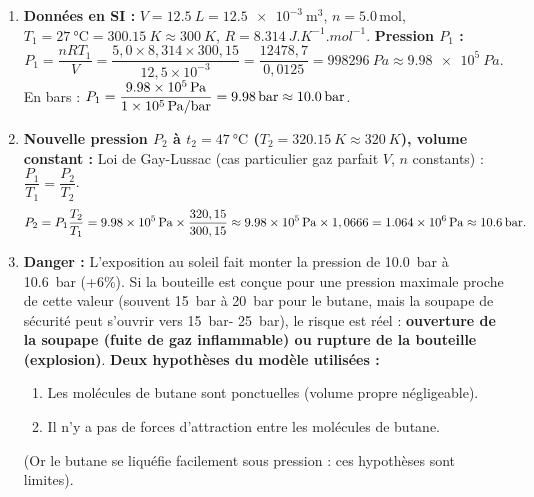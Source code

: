 \documentclass[11pt]{article}
\begin{document}
\begin{corrige}
\begin{enumerate}
\item \textbf{Données en SI :}
      $V = \SI{12,5}{L} = \SI{12,5e-3}{\cubic\meter}$,
      $n = \num{5,0}\,\mathrm{mol}$,
      $T_1 = \SI{27}{\degreeCelsius} = \SI{300,15}{K} \approx \SI{300}{K}$,
      $R = \SI{8,314}{J.K^{-1}.mol^{-1}}$.
      \textbf{Pression $P_1$ :}
      \[
      P_1 = \frac{nRT_1}{V} = \frac{5,0 \times 8,314 \times 300,15}{12,5 \times 10^{-3}}
      = \frac{12478,7}{0,0125} = \SI{998296}{Pa} \approx \SI{9,98e5}{Pa}.
      \]
      En bars : $P_1 = \dfrac{\SI{9,98e5}{Pa}}{\SI{1e5}{Pa/bar}} = \SI{9,98}{bar} \approx \textbf{\SI{10,0}{bar}}$.
\item \textbf{Nouvelle pression $P_2$ à $t_2 = \SI{47}{\degreeCelsius}$ ($T_2 = \SI{320,15}{K} \approx \SI{320}{K}$), volume constant :}
      Loi de Gay-Lussac (cas particulier gaz parfait $V$, $n$ constants) : $\dfrac{P_1}{T_1} = \dfrac{P_2}{T_2}$.
      \[
      P_2 = P_1 \frac{T_2}{T_1} = \SI{9,98e5}{Pa} \times \frac{320,15}{300,15}
      \approx \SI{9,98e5}{Pa} \times 1,0666 = \SI{1,064e6}{Pa} \approx \textbf{\SI{10,6}{bar}}.
      \]
\item \textbf{Danger :} L'exposition au soleil fait monter la pression de \SI{10,0}{bar} à \SI{10,6}{bar} (+6\%). Si la bouteille est conçue pour une pression maximale proche de cette valeur (souvent \SI{15}{bar} à \SI{20}{bar} pour le butane, mais la soupape de sécurité peut s'ouvrir vers \SI{15}{bar}- \SI{25}{bar}), le risque est réel : \textbf{ouverture de la soupape (fuite de gaz inflammable) ou rupture de la bouteille (explosion)}.
      \textbf{Deux hypothèses du modèle utilisées :}
      \begin{enumerate}
      \item Les molécules de butane sont ponctuelles (volume propre négligeable).
      \item Il n'y a pas de forces d'attraction entre les molécules de butane.
      \end{enumerate}
      (Or le butane se liquéfie facilement sous pression : ces hypothèses sont limites).
\end{enumerate}
\end{corrige}
\end{document}

